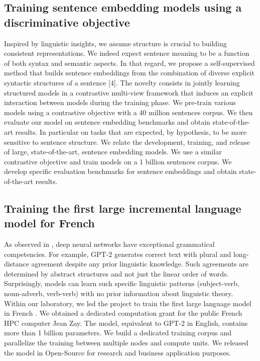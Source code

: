 \subsection{Training sentence embedding models using a discriminative objective}

Inspired by linguistic insights, we assume structure is crucial to building consistent representations. We indeed expect sentence meaning to be a function of both syntax and semantic aspects. In that regard, we propose a self-supervised method that builds sentence embeddings from the combination of diverse explicit syntactic structures of a sentence [4]. The novelty consists in jointly learning structured models in a contrastive multi-view framework that induces an explicit interaction between models during the training phase. We pre-train various models using a contrastive objective with a 40 million sentences corpus. We then evaluate our model on sentence embedding benchmarks and obtain state-of-the-art results. In particular on tasks that are expected, by hypothesis, to be more sensitive to sentence structure. We relate the development, training, and release of large, state-of-the-art, sentence embedding models. We use a similar contrastive objective and train models on a 1 billion sentences corpus. We develop specific evaluation benchmarks for sentence embeddings and obtain state-of-the-art results.

\subsection{Training the first large incremental language model for French}

As observed in \textcite{linzen_2020}, deep neural networks have exceptional grammatical competencies. For example, GPT-2 generates correct text with plural and long-distance agreement despite any prior linguistic knowledge. Such agreements are determined by abstract structures and not just the linear order of words. Surprisingly, models can learn such specific linguistic patterns (subject-verb, noun-adverb, verb-verb) with no prior information about linguistic theory. Within our laboratory, we led the project to train the first large language model in French \parencite{simoulin_2021c}. We obtained a dedicated computation grant for the public French HPC computer Jean Zay. The model, equivalent to GPT-2 in English, contains more than 1 billion parameters. We build a dedicated training corpus and parallelize the training between multiple nodes and compute units. We released the model in Open-Source for research and business application purposes. 

